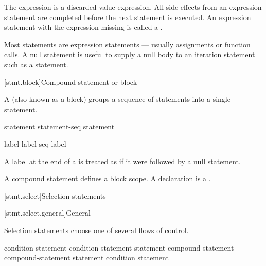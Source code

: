The expression is
a discarded-value expression.
All
%
side effects from an expression statement
are completed before the next statement is executed.
%
%
An expression statement with the expression missing is called
a .
\begin{note}
Most statements are expression statements --- usually assignments or
function calls. A null statement is useful to supply a null body to an
iteration statement such as a 
statement.
\end{note}

[stmt.block]{Compound statement or block}%
%

\pnum
A  (also known as a block) groups a
sequence of statements into a single statement.

\begin{bnf}
\br
    \terminal{\{}   \terminal{\}}
\end{bnf}

\begin{bnf}
\br
    statement\br
    statement-seq statement
\end{bnf}

\begin{bnf}
\br
    label\br
    label-seq label
\end{bnf}

A label at the end of a 
is treated as if it were followed by a null statement.

\pnum
\begin{note}
A compound statement defines a block scope.
A declaration is a .
\end{note}

[stmt.select]{Selection statements}%

[stmt.select.general]{General}%

\pnum
Selection statements choose one of several flows of control.

%
%
%
\begin{bnf}
\br
      \terminal{(}  condition \terminal{)} statement\br
      \terminal{(}  condition \terminal{)} statement  statement\br
     \opt{\terminal{!}}  compound-statement\br
     \opt{\terminal{!}}  compound-statement  statement\br
     \terminal{(}  condition \terminal{)} statement
\end{bnf}

